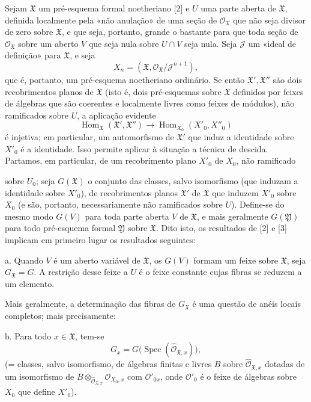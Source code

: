 Sejam $\mathfrak X$ um pré-esquema formal noetheriano [2] e $U$ uma parte
aberta de $\mathfrak X$, definida localmente pela «não anulação» de uma
seção de $\mathcal O_{\mathfrak X}$ que não seja divisor de zero sobre
$\mathfrak X$, e que seja, portanto, grande o bastante para que toda seção
de $\mathcal O_{\mathfrak X}$ sobre um aberto $V$ que seja nula sobre $U\cap V$
seja nula. Seja $\mathcal J$ um «ideal de definição» para $\mathfrak X$, e seja
\[
  X_n=(\mathfrak X,\mathcal O_{\mathfrak X}/\mathcal J^{n+1}),
\]
que é, portanto, um pré-esquema noetheriano ordinário. Se então
$\mathfrak X',\mathfrak X''$ são dois recobrimentos planos de $\mathfrak X$ (isto
é, dois pré-esquemas sobre $\mathfrak X$ definidos por feixes de álgebras que
são coerentes e localmente livres como feixes de módulos), não ramificados sobre
$U$, a aplicação evidente
\[
  \operatorname{Hom}_{\mathfrak X}(\mathfrak X',\mathfrak X'')
  \longrightarrow
  \operatorname{Hom}_{X_0}(X'_0,X''_0)
\]
é injetiva; em particular, um automorfismo de $\mathfrak X'$ que induz a
identidade sobre $X'_0$ é a identidade. Isso permite aplicar à situação a
técnica de descida. Partamos, em particular, de um recobrimento plano $X'_0$
de $X_0$, não ramificado

sobre $U_0$; seja $G(\mathfrak X)$ o conjunto das classes, salvo isomorfismo
(que induzam a identidade sobre $X'_0$), de recobrimentos planos $\mathfrak X'$
de $\mathfrak X$ que induzem $X'_0$ sobre $X_0$ (e são, portanto,
necessariamente não ramificados sobre $U$). Define-se do mesmo modo $G(V)$ para
toda parte aberta $V$ de $\mathfrak X$, e mais geralmente $G(\mathfrak Y)$
para todo pré-esquema formal $\mathfrak Y$ sobre $\mathfrak X$. Dito isto, os
resultados de [2] e [3] implicam em primeiro lugar os resultados seguintes:

\noindent a. Quando $V$ é um aberto variável de $\mathfrak X$, os $G(V)$
formam um feixe sobre $\mathfrak X$, seja $G_{\mathfrak X}=G$. A restrição desse
feixe a $U$ é o feixe constante cujas fibras se reduzem a um elemento.

Mais geralmente, a determinação das fibras de $G_{\mathfrak X}$ é uma
questão de anéis locais completos; mais precisamente:

\noindent b. Para todo $x\in\mathfrak X$, tem-se
\[
  G_x=G\bigl(\operatorname{Spec}(\widehat{\mathcal O}_{\mathfrak X,x})\bigr),
\]
(= classes, salvo isomorfismo, de álgebras finitas e livres $B$ sobre
$\widehat{\mathcal O}_{\mathfrak X,x}$ dotadas de um isomorfismo de
$B\otimes_{\widehat{\mathcal O}_{\mathfrak X,x}}\mathcal O_{X_0,x}$ com
$\mathcal O'_{0x}$, onde $\mathcal O'_0$ é o feixe de álgebras sobre
$X_0$ que define $X'_0$).

